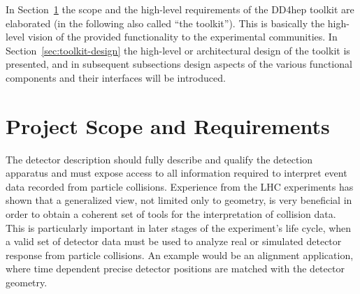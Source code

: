 In Section~\ref{sec:architectural-concepts} the scope and the high-level requirements of the DD4hep toolkit are elaborated (in the following also called ``the toolkit''). This is basically the high-level vision 
of the provided functionality to the experimental communities. In Section~\ref{sec:toolkit-design} the high-level or architectural design of the toolkit is presented, and in subsequent subsections design aspects of the various functional components and their interfaces will be introduced.

\section{Project Scope and Requirements}
\label{sec:architectural-concepts}

The detector description should fully describe and qualify the detection apparatus and must expose access to all information required to interpret event data recorded from particle collisions. Experience from the LHC experiments has shown that a generalized view, not limited only to geometry, is very beneficial in order to obtain a coherent set of tools for the interpretation of collision data. This is particularly important in later stages of the experiment's life cycle, when a valid set of detector data must be used to analyze real or simulated detector response from particle collisions. An example would be an alignment application, where time dependent precise detector positions are matched with the detector geometry.


